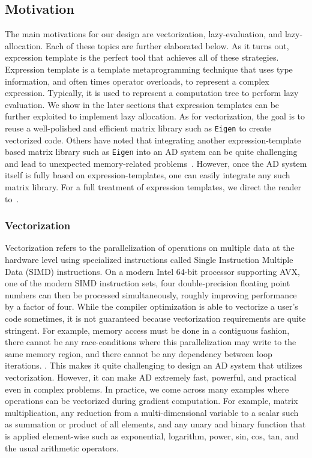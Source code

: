 \subsection{Motivation}\label{ssec:motivation}

The main motivations for our design are vectorization, lazy-evaluation, and lazy-allocation.
Each of these topics are further elaborated below.
As it turns out, expression template is the perfect tool that achieves
all of these strategies.
Expression template is a template metaprogramming technique that 
uses type information, and often times operator overloads, to represent a complex expression.
Typically, it is used to represent a computation tree to perform lazy evaluation.
We show in the later sections that expression templates can be further exploited
to implement lazy allocation.
As for vectorization, the goal is to reuse a well-polished and efficient
matrix library such as \verb|Eigen| to create vectorized code.
Others have noted that integrating another expression-template based matrix library 
such as \verb|Eigen| into an AD system can be quite challenging~\cite{hogan:2014}
and lead to unexpected memory-related problems~\cite{carpenter:2015}.
However, once the AD system itself is fully based on expression-templates,
one can easily integrate any such matrix library.
For a full treatment of expression templates, 
we direct the reader to~\cite{vandevoorde:2002}.

\subsubsection{Vectorization}

Vectorization refers to the parallelization of operations on multiple data at the hardware level 
using specialized instructions called Single Instruction Multiple Data (SIMD) instructions.
On a modern Intel 64-bit processor supporting AVX, one of the modern SIMD instruction sets,
four double-precision floating point numbers can then be processed simultaneously,
roughly improving performance by a factor of four.
While the compiler optimization is able to vectorize a user's code sometimes, it is not guaranteed
because vectorization requirements are quite stringent. 
For example, memory access must be done in a contiguous fashion, 
there cannot be any race-conditions where this parallelization may write to the same memory region,
and there cannot be any dependency between loop iterations.
.
This makes it quite challenging to design an AD system that utilizes vectorization.
However, it can make AD extremely fast, powerful, and practical even in complex problems.
In practice, we come across many examples where operations can be vectorized during gradient computation.
For example, matrix multiplication, any reduction from a multi-dimensional variable to a scalar such as
summation or product of all elements, and any unary and binary function that is applied element-wise such as
exponential, logarithm, power, sin, cos, tan, and the usual arithmetic operators.

